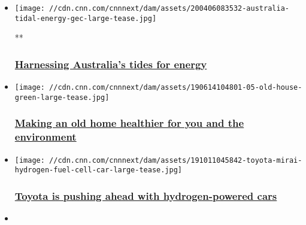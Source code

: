 \begin{itemize}
\item
  \href{/videos/business/2020/04/06/australia-tidal-energy-gec.cnn-business}{}

  \texttt{[image: //cdn.cnn.com/cnnnext/dam/assets/200406083532-australia-tidal-energy-gec-large-tease.jpg]}

  **

  \hypertarget{harnessing-australias-tides-for-energy}{%
  \subsubsection{\texorpdfstring{\href{/videos/business/2020/04/06/australia-tidal-energy-gec.cnn-business}{Harnessing
  Australia's tides for
  energy}}{Harnessing Australia's tides for energy}}\label{harnessing-australias-tides-for-energy}}
\item
  \href{/2019/06/18/success/passive-house/index.html}{}

  \texttt{[image: //cdn.cnn.com/cnnnext/dam/assets/190614104801-05-old-house-green-large-tease.jpg]}

  \hypertarget{making-an-old-home-healthier-for-you-and-the-environment}{%
  \subsubsection{\texorpdfstring{\href{/2019/06/18/success/passive-house/index.html}{Making
  an old home healthier for you and the
  environment}}{Making an old home healthier for you and the environment}}\label{making-an-old-home-healthier-for-you-and-the-environment}}
\item
  \href{/2019/10/11/business/toyota-mirai-hydrogen-fuel-cell-car/index.html}{}

  \texttt{[image: //cdn.cnn.com/cnnnext/dam/assets/191011045842-toyota-mirai-hydrogen-fuel-cell-car-large-tease.jpg]}

  \hypertarget{toyota-is-pushing-ahead-with-hydrogen-powered-cars}{%
  \subsubsection{\texorpdfstring{\href{/2019/10/11/business/toyota-mirai-hydrogen-fuel-cell-car/index.html}{Toyota
  is pushing ahead with hydrogen-powered
  cars}}{Toyota is pushing ahead with hydrogen-powered cars}}\label{toyota-is-pushing-ahead-with-hydrogen-powered-cars}}
\item
  \href{/videos/business/2019/10/10/london-zero-emissions-buses.cnn-business}{}


\end{itemize}
